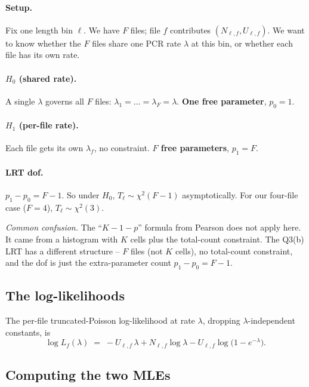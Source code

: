 \documentclass[11pt]{article}
\begin{document}
\paragraph{Setup.}
Fix one length bin $\ell$. We have $F$ files; file $f$ contributes
$(N_{\ell,f}, U_{\ell,f})$. We want to know whether the $F$ files share one
PCR rate $\lambda$ at this bin, or whether each file has its own rate.

\paragraph{$H_0$ (shared rate).}
A single $\lambda$ governs all $F$ files: $\lambda_1 = \dots = \lambda_F =
\lambda$. \textbf{One free parameter}, $p_0 = 1$.

\paragraph{$H_1$ (per-file rate).}
Each file gets its own $\lambda_f$, no constraint. \textbf{$F$ free
parameters}, $p_1 = F$.

\paragraph{LRT dof.}
$p_1 - p_0 = F - 1$. So under $H_0$, $T_\ell \sim \chi^{2}(F - 1)$
asymptotically. For our four-file case ($F = 4$), $T_\ell \sim \chi^{2}(3)$.

\emph{Common confusion.} The ``$K - 1 - p$'' formula from Pearson does not
apply here. It came from a histogram with $K$ cells plus the total-count
constraint. The Q3(b) LRT has a different structure -- $F$ files (not $K$
cells), no total-count constraint, and the dof is just the extra-parameter
count $p_1 - p_0 = F - 1$.

\subsection{The log-likelihoods}

The per-file truncated-Poisson log-likelihood at rate $\lambda$, dropping
$\lambda$-independent constants, is
\[
   \log L_f(\lambda) \;=\; -U_{\ell,f}\,\lambda
                          + N_{\ell,f} \log \lambda
                          - U_{\ell,f}\log\!\bigl(1 - e^{-\lambda}\bigr).
\]

\subsection{Computing the two MLEs}
\end{document}
